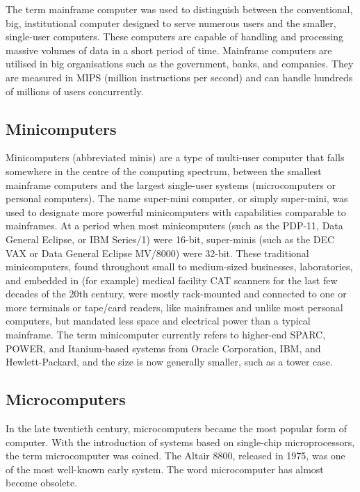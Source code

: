 \documentclass[british]{extreport}
\begin{document}
The term mainframe computer was used to distinguish between the conventional,
big, institutional computer designed to serve numerous users and the
smaller, single-user computers. These computers are capable of handling
and processing massive volumes of data in a short period of time.
Mainframe computers are utilised in big organisations such as the
government, banks, and companies. They are measured in MIPS (million
instructions per second) and can handle hundreds of millions of users
concurrently.

\subsection{Minicomputers}

Minicomputers (abbreviated \textquotedbl minis\textquotedbl ) are
a type of multi-user computer that falls somewhere in the centre of
the computing spectrum, between the smallest mainframe computers and
the largest single-user systems (microcomputers or personal computers).
The name super-mini computer, or simply super-mini, was used to designate
more powerful minicomputers with capabilities comparable to mainframes.
At a period when most minicomputers (such as the PDP-11, Data General
Eclipse, or IBM Series/1) were 16-bit, super-minis (such as the DEC
VAX or Data General Eclipse MV/8000) were 32-bit. These traditional
minicomputers, found throughout small to medium-sized businesses,
laboratories, and embedded in (for example) medical facility CAT scanners
for the last few decades of the 20th century, were mostly rack-mounted
and connected to one or more terminals or tape/card readers, like
mainframes and unlike most personal computers, but mandated less space
and electrical power than a typical mainframe. The term \textquotedbl minicomputer\textquotedbl{}
currently refers to higher-end SPARC, POWER, and Itanium-based systems
from Oracle Corporation, IBM, and Hewlett-Packard, and the size is
now generally smaller, such as a tower case.

\subsection{Microcomputers}

In the late twentieth century, microcomputers became the most popular
form of computer. With the introduction of systems based on single-chip
microprocessors, the term \textquotedbl microcomputer\textquotedbl{}
was coined. The Altair 8800, released in 1975, was one of the most
well-known early system. The word \textquotedbl microcomputer\textquotedbl{}
has almost become obsolete.
\end{document}
